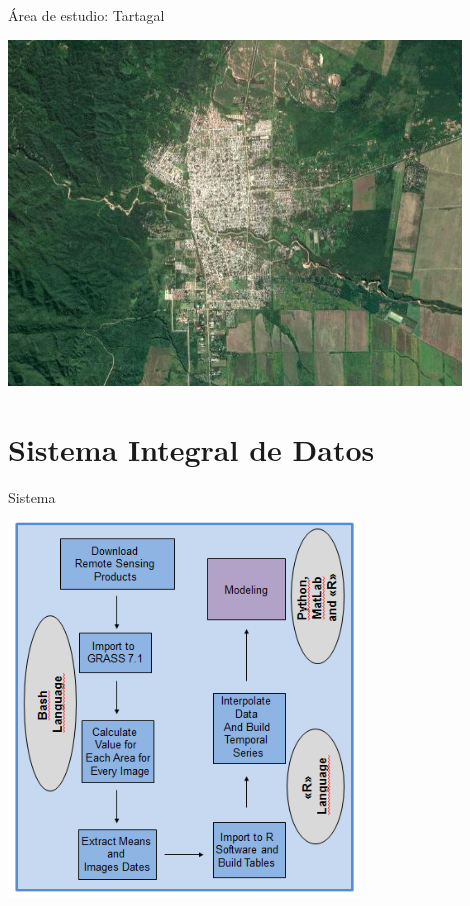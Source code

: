 \documentclass[10pt]{beamer}
\begin{document}
\begin{frame}{Área de estudio: Tartagal}
\begin{center}
\includegraphics[width=0.9\textwidth]{tartagal.jpeg}
\end{center}

\end{frame}

\section{Sistema Integral de Datos}
\begin{frame}{Sistema}
  \begin{center}
    \includegraphics[width=0.7\textwidth]{sistema.png}
  \end{center}

\end{frame}
\end{document}
